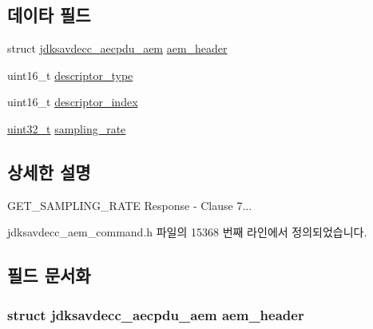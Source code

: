 \subsection*{데이타 필드}
\begin{DoxyCompactItemize}
\item 
struct \hyperlink{structjdksavdecc__aecpdu__aem}{jdksavdecc\+\_\+aecpdu\+\_\+aem} \hyperlink{structjdksavdecc__aem__command__get__sampling__rate__response_ae1e77ccb75ff5021ad923221eab38294}{aem\+\_\+header}
\item 
uint16\+\_\+t \hyperlink{structjdksavdecc__aem__command__get__sampling__rate__response_ab7c32b6c7131c13d4ea3b7ee2f09b78d}{descriptor\+\_\+type}
\item 
uint16\+\_\+t \hyperlink{structjdksavdecc__aem__command__get__sampling__rate__response_a042bbc76d835b82d27c1932431ee38d4}{descriptor\+\_\+index}
\item 
\hyperlink{parse_8c_a6eb1e68cc391dd753bc8ce896dbb8315}{uint32\+\_\+t} \hyperlink{structjdksavdecc__aem__command__get__sampling__rate__response_ab17c387eb7798bbb74ccfedd6f4cf21b}{sampling\+\_\+rate}
\end{DoxyCompactItemize}


\subsection{상세한 설명}
G\+E\+T\+\_\+\+S\+A\+M\+P\+L\+I\+N\+G\+\_\+\+R\+A\+TE Response -\/ Clause 7... 

jdksavdecc\+\_\+aem\+\_\+command.\+h 파일의 15368 번째 라인에서 정의되었습니다.



\subsection{필드 문서화}
\subsubsection[{\texorpdfstring{aem\+\_\+header}{aem_header}}]{\setlength{\rightskip}{0pt plus 5cm}struct {\bf jdksavdecc\+\_\+aecpdu\+\_\+aem} aem\+\_\+header}\hypertarget{structjdksavdecc__aem__command__get__sampling__rate__response_ae1e77ccb75ff5021ad923221eab38294}{}\label{structjdksavdecc__aem__command__get__sampling__rate__response_ae1e77ccb75ff5021ad923221eab38294}


